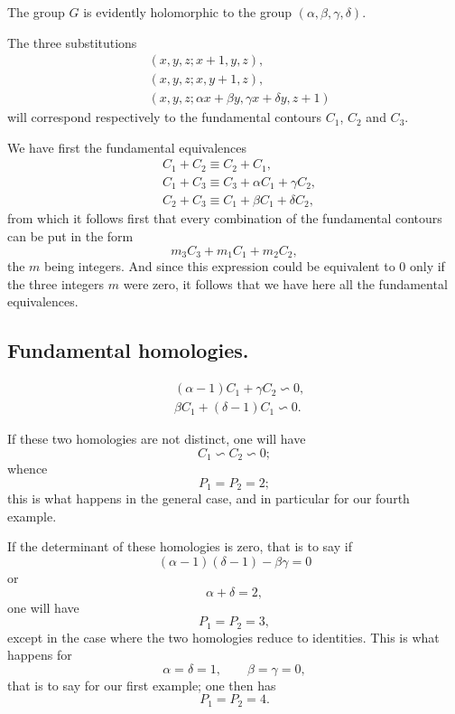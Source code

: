 \documentclass{article}
\begin{document}
The group $G$ is evidently holomorphic to the group $(\alpha, \beta, \gamma, \delta)$.

The three substitutions
\[ \begin{aligned} &(x, y, z; x + 1, y, z),\\ &(x, y, z; x, y + 1, z),\\ &(x, y, z; \alpha x + \beta y, \gamma x + \delta y, z + 1) \end{aligned} \]
will correspond respectively to the fundamental contours $C_{1}$, $C_{2}$ and $C_{3}$.

We have first the fundamental equivalences
\[ \begin{aligned} &C_{1} + C_{2} \equiv C_{2} + C_{1},\\ &C_{1} + C_{3} \equiv C_{3} + \alpha C_{1} + \gamma C_{2},\\ &C_{2} + C_{3} \equiv C_{1} + \beta C_{1} + \delta C_{2}, \end{aligned} \]
from which it follows first that every combination of the fundamental contours can be put in the form
\[ m_{3}C_{3} + m_{1}C_{1} + m_{2}C_{2}, \]
the $m$ being integers. And since this expression could be equivalent to 0 only if the three integers $m$ were zero, it follows that we have here all the fundamental equivalences.

\subsection*{Fundamental homologies.}

\[ \begin{aligned} &(\alpha - 1)C_{1} + \gamma C_{2} \backsim 0,\\ &\beta C_{1} + (\delta - 1) C_{1} \backsim 0. \end{aligned} \]

If these two homologies are not distinct, one will have
\[ C_{1} \backsim C_{2} \backsim 0; \]
whence
\[ P_{1} = P_{2} = 2; \]
this is what happens in the general case, and in particular for our fourth example.

If the determinant of these homologies is zero, that is to say if
\[ (\alpha - 1)(\delta - 1) - \beta\gamma = 0 \]
or
\[ \alpha + \delta = 2, \]
one will have
\[ P_{1} = P_{2} = 3, \]
except in the case where the two homologies reduce to identities. This is what happens for
\[ \alpha = \delta = 1, \qquad \beta = \gamma = 0, \]
that is to say for our first example; one then has
\[ P_{1} = P_{2} = 4. \]
\end{document}

